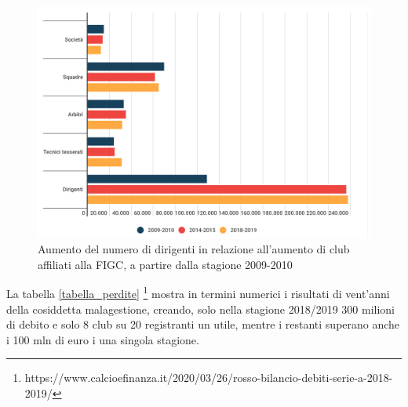 \documentclass[
    corpo=11.5pt,
    oneside,
    evenboxes,
    tipotesi=triennale,
    stile=classica,
    oldstyle,
    autoretitolo,
    greek,
]{toptesi}
\begin{document}
\begin{interlinea}{1.5}
\begin{figure}
    \includegraphics[scale = 0.5]{img/aumento_dirigenti.png}
    \caption{Aumento del numero di dirigenti in relazione all'aumento di club affiliati alla FIGC, a partire dalla stagione 2009-2010}
    \label{fig: aumento_dirigenti}
\end{figure}
\newpage
La tabella \ref{tabella_perdite} \footnote{https://www.calcioefinanza.it/2020/03/26/rosso-bilancio-debiti-serie-a-2018-2019/}
mostra in termini numerici i risultati di vent'anni della cosiddetta malagestione, creando, solo nella stagione 
2018/2019 300 milioni di debito e solo 8 club su 20 registranti un utile, mentre i restanti superano anche i 100 mln di euro i una singola stagione.
\begin{table}
\end{table}
\end{interlinea}
\end{document}
